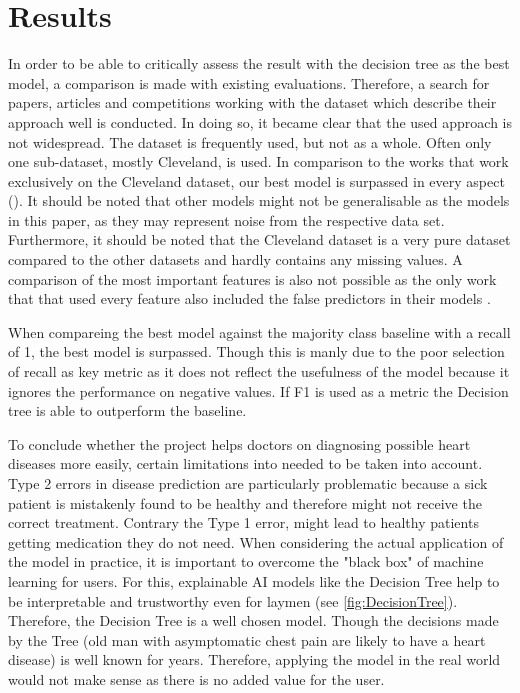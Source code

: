
\section{Results} \label{sec:results}

In order to be able to critically assess the result with the decision tree as the best model, a comparison is made with existing evaluations. Therefore, a search for papers, articles and competitions working with the dataset which describe their approach well is conducted. In doing so,  it became clear that the used approach is not widespread. The dataset is frequently used, but not as a whole. Often only one sub-dataset, mostly Cleveland, is used.  In comparison to the works that work exclusively on the Cleveland dataset, our best model is surpassed in every aspect (\cite{Ayatollahi2019,alotaibi2019, uyar2017}). It should be noted that other models might not be generalisable as the models in this paper, as they may represent noise from the respective data set. Furthermore, it should be noted that the Cleveland dataset is a very pure dataset compared to the other datasets and hardly contains any missing values. 
A comparison of the most important features is also not possible as the only work that that used every feature also included the false predictors in their models \cite{garate-escamila2020}.

When compareing the best model against the majority class baseline with a recall of 1, the best model is surpassed. Though this is manly due to the poor selection of recall as key metric as it does not reflect the usefulness of the model because it ignores the performance on negative values. If F1 is used as a metric the Decision tree is able to outperform the baseline. 

To conclude whether the project helps doctors on diagnosing possible heart diseases more easily, certain limitations into needed to be taken into account. Type 2 errors in disease prediction are particularly problematic because a sick patient is mistakenly found to be healthy and therefore might not receive the correct treatment. Contrary the Type 1 error, might lead to healthy patients getting medication they do not need.   When considering the actual application of the model in practice, it is important to overcome the "black box" of machine learning for users. For this, explainable AI models like the Decision Tree help to be interpretable and trustworthy even for laymen (see \cref{fig:DecisionTree}). Therefore, the Decision Tree is a well chosen model. Though the decisions made by the Tree (old man with asymptomatic chest pain are likely to have a heart disease) is well known for years. Therefore, applying the model in the real world would not make sense as there is no added value for the user. 